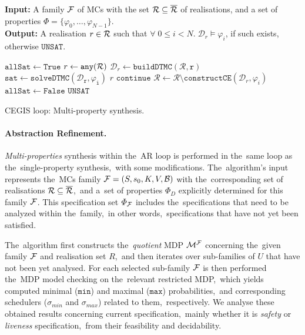 \begin{algorithm}[h!]
\hspace*{\algorithmicindent} \textbf{Input:} A family $\mathcal{F}$ of MCs with the set $\mathcal{R} \subseteq \overline{\mathcal{R}}$ of realisations, and a set of properties $\varPhi = \{ \varphi_0, \dots, \varphi_{N-1} \}$. \\
\hspace*{\algorithmicindent} \textbf{Output:}  A realisation $r \in \mathcal{R}$ such that $\forall \; 0 \leq i < N. \; \mathcal{D}_r \models \varphi_i$, if such exists, otherwise $\mathtt{UNSAT}$. \\
\vspace*{-1.5em}
\begin{algorithmic}[1]
    \WHILE{$\rlz \neq \emptyset$}
        \STATE $\mathtt{allSat} \leftarrow \mathtt{True}$
        \STATE $r \leftarrow \mathtt{any(\mathcal{R})}$
        \STATE $\mathcal{D}_r\leftarrow \mathtt{buildDTMC(\mathcal{R}, r)}$
            \STATE $\mathtt{sat} \leftarrow \mathtt{solveDTMC(\mathcal{D}_r, \varphi_{i})}$
                    \RETURN $r$
                \ELSE
                    \STATE $\mathtt{continue}$
                \ENDIF
            \ELSE
                \STATE $\mathcal{R} \leftarrow \mathcal{R} \setminus \mathtt{constructCE}(\mathcal{D}_r, \varphi_{i})$
                \STATE $\mathtt{allSat} \leftarrow \mathtt{False}$
            \ENDIF
        \ENDFOR
    \ENDWHILE
    \RETURN $\mathtt{UNSAT}$
\end{algorithmic}
\caption{CEGIS loop: Multi-property synthesis.}
\label{alg:cegis_multi}
\end{algorithm}

\paragraph{Abstraction Refinement.}
\textit{Multi-properties} synthesis within the~AR loop is performed in the~same loop as the~single-property synthesis,~with some modifications.
The~algorithm's input represents the~MCs family $\mathcal{F} = (S,s_{0},K, V, \mathcal{B})$ with the~corresponding set of realisations $\mathcal{R} \subseteq \overline{\mathcal{R}}$,~and a~set of properties $\varPhi_D$ explicitly determined for this family $\mathcal{F}$.
This specification set $\varPhi_{\mathcal{F}}$ includes the~specifications that need to be analyzed within the~family,~in other words,~specifications that have not yet been satisfied.

The~algorithm first constructs the~\textit{quotient} MDP $\mathcal{M}^{\mathcal{F}}$ concerning the~given family $\mathcal{F}$ and realisation set $R$,~and then iterates over sub-families of $U$ that have not been yet analysed.
For each selected sub-family $\mathcal{F}$ is then performed the~MDP model checking on the~relevant restricted MDP,~which yields computed minimal ($\mathtt{min}$) and maximal ($\mathtt{max}$) probabilities,~and corresponding schedulers ($\sigma_{min}$ and $\sigma_{max}$) related to them,~respectively.
We analyse these obtained results concerning current specification,~mainly whether it is \textit{safety} or \textit{liveness} specification,~from their feasibility and decidability.

